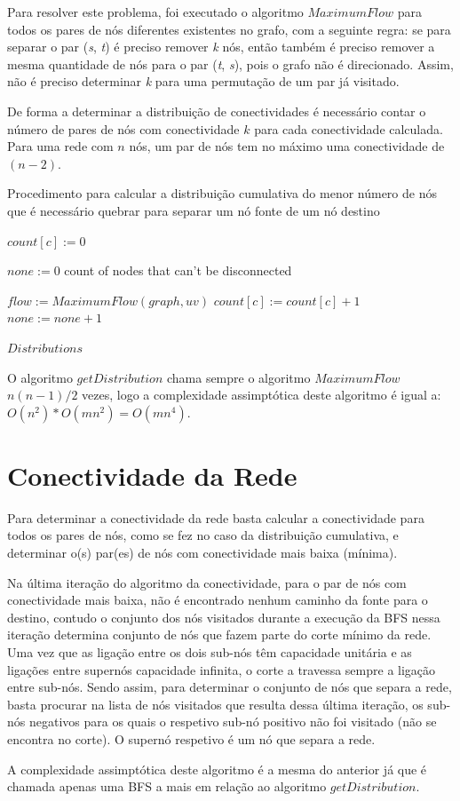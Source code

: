 \documentclass[12pt,a4paper]{article}
\begin{document}
Para resolver este problema, foi executado o algoritmo $MaximumFlow$ para todos os pares de nós diferentes existentes no grafo, com a seguinte regra: se para separar o par (\textit{s}, \textit{t}) é preciso remover \textit{k} nós, então também é preciso remover a mesma quantidade de nós para o par (\textit{t}, \textit{s}), pois o grafo não é direcionado. Assim, não é preciso determinar \textit{k} para uma permutação de um par já visitado.

De forma a determinar a distribuição de conectividades é necessário contar o número de pares de nós com conectividade $k$ para cada conectividade calculada. Para uma rede com $n$ nós, um par de nós tem no máximo uma conectividade de $(n - 2)$. 

\begin{algorithm}
\caption{Procedimento para calcular a distribuição cumulativa do menor número de nós que é necessário quebrar para separar um nó fonte de um nó destino}\label{alg:distribution}
\begin{algorithmic}[1]
    		\State $count[c] := 0$
    \EndFor
    
    \State $none := 0$ \Comment count of nodes that can't be disconnected
		
    		\State $flow := MaximumFlow(graph, uv)$
			\State $count[c] := count[c] + 1$
		\Else
			\State $none := none + 1$
		\EndIf
    \EndFor
    	
  	\Return $Distributions$
\EndProcedure
\end{algorithmic}
\end{algorithm}

O algoritmo $getDistribution$ chama sempre o algoritmo $MaximumFlow$ $n(n-1)/2$ vezes, logo a complexidade assimptótica deste algoritmo é igual a: $O(n^2) * O(m n^2) = O(m n^4)$.

\section{Conectividade da Rede}

Para determinar a conectividade da rede basta calcular a conectividade para todos os pares de nós, como se fez no caso da distribuição cumulativa, e determinar o(s) par(es) de nós com conectividade mais baixa (mínima).

Na última iteração do algoritmo da conectividade, para o par de nós com conectividade mais baixa, não é encontrado nenhum caminho da fonte para o destino, contudo o conjunto dos nós visitados durante a execução da BFS nessa iteração determina conjunto de nós que fazem parte do corte mínimo da rede. Uma vez que as ligação entre os dois sub-nós têm capacidade unitária e as ligações entre supernós capacidade infinita, o corte a travessa sempre a ligação entre sub-nós. Sendo assim, para determinar o conjunto de nós que separa a rede, basta procurar na lista de nós visitados que resulta dessa última iteração, os sub-nós negativos para os quais o respetivo sub-nó positivo não foi visitado (não se encontra no corte). O supernó respetivo é um nó que separa a rede.

A complexidade assimptótica deste algoritmo é a mesma do anterior já que é chamada apenas uma BFS a mais em relação ao algoritmo $getDistribution$.
\end{document}
